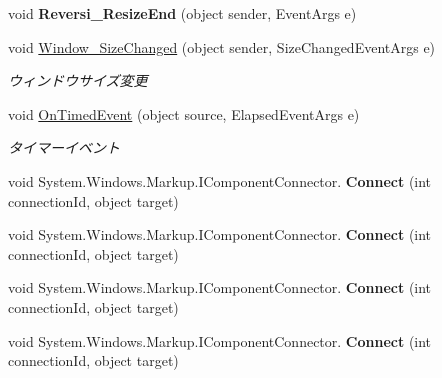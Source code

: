 \begin{DoxyCompactItemize}
\item 
void {\bfseries Reversi\+\_\+\+Resize\+End} (object sender, Event\+Args e)\hypertarget{class_reversi4color_wpf_1_1_main_window_a8a397f4fa3bd549f239e462f0f99f8bc}{}\label{class_reversi4color_wpf_1_1_main_window_a8a397f4fa3bd549f239e462f0f99f8bc}

\item 
void \hyperlink{class_reversi4color_wpf_1_1_main_window_a87821b553e20bd31063a850a48dd4882}{Window\+\_\+\+Size\+Changed} (object sender, Size\+Changed\+Event\+Args e)
\begin{DoxyCompactList}\small\item\em ウィンドウサイズ変更 \end{DoxyCompactList}\item 
void \hyperlink{class_reversi4color_wpf_1_1_main_window_a393b6648bbb8d33ff0cee0839a520de4}{On\+Timed\+Event} (object source, Elapsed\+Event\+Args e)
\begin{DoxyCompactList}\small\item\em タイマーイベント \end{DoxyCompactList}\item 
void System.\+Windows.\+Markup.\+I\+Component\+Connector. {\bfseries Connect} (int connection\+Id, object target)\hypertarget{class_reversi4color_wpf_1_1_main_window_adfe8de6a6008977dc0ea46457afbc670}{}\label{class_reversi4color_wpf_1_1_main_window_adfe8de6a6008977dc0ea46457afbc670}

\item 
void System.\+Windows.\+Markup.\+I\+Component\+Connector. {\bfseries Connect} (int connection\+Id, object target)\hypertarget{class_reversi4color_wpf_1_1_main_window_adfe8de6a6008977dc0ea46457afbc670}{}\label{class_reversi4color_wpf_1_1_main_window_adfe8de6a6008977dc0ea46457afbc670}

\item 
void System.\+Windows.\+Markup.\+I\+Component\+Connector. {\bfseries Connect} (int connection\+Id, object target)\hypertarget{class_reversi4color_wpf_1_1_main_window_adfe8de6a6008977dc0ea46457afbc670}{}\label{class_reversi4color_wpf_1_1_main_window_adfe8de6a6008977dc0ea46457afbc670}

\item 
void System.\+Windows.\+Markup.\+I\+Component\+Connector. {\bfseries Connect} (int connection\+Id, object target)\hypertarget{class_reversi4color_wpf_1_1_main_window_adfe8de6a6008977dc0ea46457afbc670}{}\label{class_reversi4color_wpf_1_1_main_window_adfe8de6a6008977dc0ea46457afbc670}

\end{DoxyCompactItemize}
